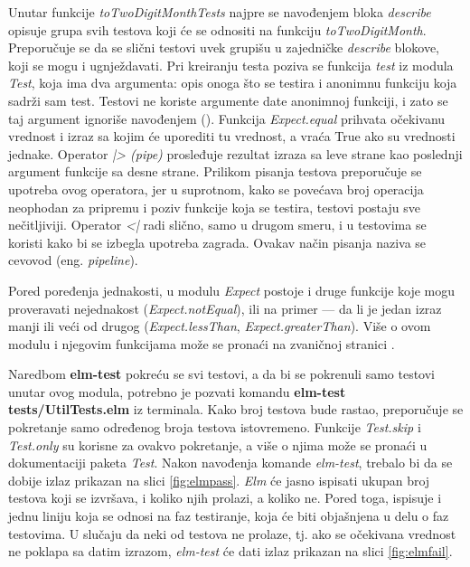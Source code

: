 \documentclass[12pt,oneside]{memoir}
\begin{document}
\par Unutar funkcije \emph{toTwoDigitMonthTests} najpre se navođenjem bloka \emph{describe} opisuje grupa svih testova koji će se odnositi na funkciju \emph{toTwoDigitMonth}. Preporučuje se da se slični testovi uvek grupišu u zajedničke \emph{describe} blokove, koji se mogu i ugnježdavati. Pri kreiranju testa poziva se funkcija \emph{test} iz modula \emph{Test}, koja ima dva argumenta: opis onoga što se testira i anonimnu funkciju koja sadrži sam test. Testovi ne koriste argumente date anonimnoj funkciji, i zato se taj argument ignoriše navođenjem (\textunderscore). Funkcija \emph{Expect.equal} prihvata očekivanu vrednost i izraz sa kojim će uporediti tu vrednost, a vraća True ako su vrednosti jednake. Operator \emph{|> (pipe)} prosleđuje rezultat izraza sa leve strane kao poslednji argument funkcije sa desne strane. Prilikom pisanja testova preporučuje se upotreba ovog operatora, jer u suprotnom, kako se povećava broj operacija neophodan za pripremu i poziv funkcije koja se testira, testovi postaju sve nečitljiviji. Operator \emph{<|} radi slično, samo u drugom smeru, i u testovima se koristi kako bi se izbegla upotreba zagrada. Ovakav način pisanja naziva se cevovod (eng. \emph{pipeline}). 
\par Pored poređenja jednakosti, u modulu \emph{Expect} postoje i druge funkcije koje mogu proveravati nejednakost (\emph{Expect.notEqual}), ili na primer --- da li je jedan izraz manji ili veći od drugog (\emph{Expect.lessThan}, \emph{Expect.greaterThan}). Više o ovom modulu i njegovim funkcijama može se pronaći na zvaničnoj stranici \cite{expect}.
\par Naredbom \textbf{elm-test} pokreću se svi testovi, a da bi se pokrenuli samo testovi unutar ovog modula, potrebno je pozvati komandu \textbf{elm-test tests/UtilTests.elm} iz terminala. Kako broj testova bude rastao, preporučuje se pokretanje samo određenog broja testova istovremeno. Funkcije \emph{Test.skip} i \emph{Test.only} su korisne za ovakvo pokretanje, a više o njima može se pronaći u dokumentaciji paketa \emph{Test}.  Nakon navođenja komande \emph{elm-test}, trebalo bi da se dobije izlaz prikazan na slici \ref{fig:elmpass}. \emph{Elm} će jasno ispisati ukupan broj testova koji se izvršava, i koliko njih prolazi, a koliko ne. Pored toga, ispisuje i jednu liniju koja se odnosi na faz testiranje, koja će biti objašnjena u delu o faz testovima. U slučaju da neki od testova ne prolaze, tj. ako se očekivana vrednost ne poklapa sa datim izrazom, \emph{elm-test} će dati izlaz prikazan na slici \ref{fig:elmfail}. 
\end{document}
